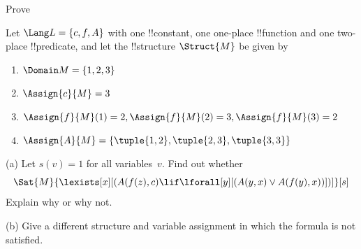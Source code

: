 \documentclass[../../../include/open-logic-section]{subfiles}
\begin{document}
\begin{prob}
  Prove 
\end{prob}
\tagendprob

\begin{prob}
Let $\Lang L = \{c, f, A\}$ with one !!{constant}, one one-place
!!{function} and one two-place !!{predicate}, and let the
!!{structure} $\Struct{M}$ be given by
\begin{enumerate}
\item $\Domain M = \{1, 2, 3\}$
\item $\Assign{c}{M} = 3$
\item $\Assign{f}{M}(1) = 2, \Assign{f}{M}(2) = 3, \Assign{f}{M}(3) = 2$
\item $\Assign{A}{M} = \{\tuple{1, 2}, \tuple{2, 3}, \tuple{3, 3}\}$
\end{enumerate}
(a) Let $s(v) = 1$ for all variables~$v$.  Find out whether
\[
\Sat{M}{\lexists[x][(A(f(z), c) \lif \lforall[y][(A(y, x) \lor A(f(y),
      x))])]}[s]
\]
Explain why or why not.

(b) Give a different structure and variable assignment in which the
formula is not satisfied.
\end{prob}
\tagendprob
\end{document}
